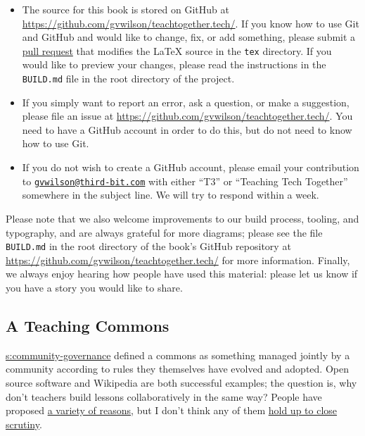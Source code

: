 \begin{itemize}
\item
  The source for this book is stored on GitHub at
  \url{https://github.com/gvwilson/teachtogether.tech/}. If you know how to use Git and
  GitHub and would like to change, fix, or add something, please
  submit a \protect\hyperlink{g:pull-request}{pull request} that modifies the LaTeX
  source in the \texttt{tex} directory. If you would like to preview your
  changes, please read the instructions in the \texttt{BUILD.md} file in the
  root directory of the project.
\item
  If you simply want to report an error, ask a question, or make a
  suggestion, please file an issue at
  \url{https://github.com/gvwilson/teachtogether.tech/}. You need to have a GitHub account in
  order to do this, but do not need to know how to use Git.
\item
  If you do not wish to create a GitHub account, please email your
  contribution to \href{mailto:gvwilson@third-bit.com}{\nolinkurl{gvwilson@third-bit.com}} with either
  ``T3'' or ``Teaching Tech Together'' somewhere in the subject line. We
  will try to respond within a week.
\end{itemize}

Please note that we also welcome improvements to our build process,
tooling, and typography, and are always grateful for more diagrams;
please see the file \texttt{BUILD.md} in the root directory of the book's
GitHub repository at \url{https://github.com/gvwilson/teachtogether.tech/} for more
information. Finally, we always enjoy hearing how people have used
this material: please let us know if you have a story you would like
to share.

\subsection{A Teaching Commons}\label{a-teaching-commons}

\protect\hyperlink{SECTION}{s:community-governance} defined a commons as something
managed jointly by a community according to rules they themselves have
evolved and adopted. Open source software and Wikipedia are both
successful examples; the question is, why don't teachers build lessons
collaboratively in the same way? People have proposed \href{http://blog.mrmeyer.com/2016/why-secondary-teachers-dont-want-a-github-for-lesson-plans/}{a variety of
reasons}, but I don't think any of them \href{http://third-bit.com/2016/04/29/why-teachers-dont-collaborate.html}{hold up to
close scrutiny}.

